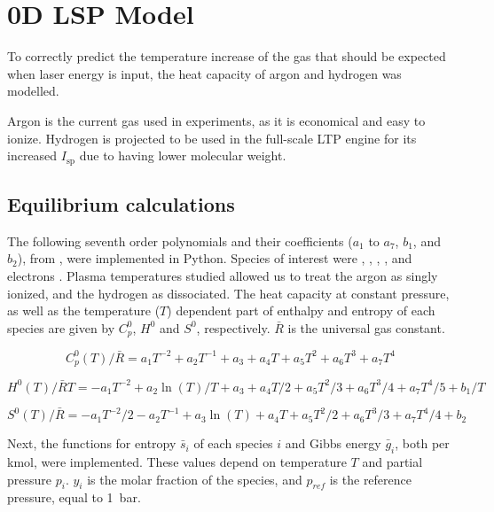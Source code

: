 \chapter{0D LSP Model} \label{chp:models}

    To correctly predict the temperature increase of the gas that should be expected when laser energy is input, the heat capacity of argon and hydrogen was modelled. 
    
    Argon is the current gas used in experiments, as it is economical and easy to ionize. Hydrogen is projected to be used in the full-scale LTP engine for its increased $I_\mathrm{sp}$ due to having lower molecular weight.

    \section{Equilibrium calculations} \label{sec:equilibrium calcs}
        
        The following seventh order polynomials and their coefficients ($a_1$ to $a_7$, $b_1$, and $b_2$), from \textcite{mcbrideNASAGlennCoefficients2002}, were implemented in Python. Species of interest were , , , , and electrons . Plasma temperatures studied allowed us to treat the argon as singly ionized, and the hydrogen as dissociated. The heat capacity at constant pressure, as well as the temperature ($T$) dependent part of enthalpy and entropy of each species are given by $C_p^0$, $H^0$ and $S^0$, respectively. $\bar R$ is the universal gas constant.

        \begin{equation}
            C_p^0 (T)/\bar R = a_1 T^{-2} + a_2 T^{-1} + a_3 + a_4   T + a_5 T^2 + a_6 T^3 + a_7 T^4
        \end{equation} 
        
        \begin{equation}
            H^0 (T)/\bar RT = -a_1 T^{-2} + a_2 \ln(T)/T + a_3 + a_4 T / 2 + a_5 {T^2}/3 + a_6 {T^3}/4 + a_7 {T^4}/5 + b_1/T
        \end{equation}
        
        \begin{equation}
            S^0(T)/\bar R = -a_1 T^{-2}/2 - a_2 T^{-1} + a_3\ln(T) + a_4   T + a_5 {T^2}/2 + a_6 T^3/3 + a_7 T^4/4 + b_2
        \end{equation}

        Next, the functions for entropy $\bar s_i$ of each species $i$ and Gibbs energy $\bar g_i$, both per \unit{kmol}, were implemented. These values depend on temperature $T$ and partial pressure $p_i$. $y_i$ is the molar fraction of the species, and $p_{ref}$ is the reference pressure, equal to \qty{1}{bar}.
        

